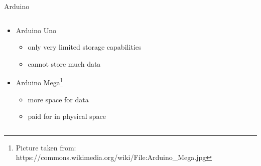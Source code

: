 \documentclass{beamer}
\begin{document}
	\begin{frame}[t]{Arduino}
		\begin{columns}[T]
			\begin{column}{0.5\textwidth}
				\begin{minipage}{\textwidth}
					\resizebox{0.9\textwidth}{!}{}
				\end{minipage}
				\begin{minipage}{\textwidth}
					\vspace{0.5cm}
					\begin{itemize}
						\item Arduino Uno
							\begin{itemize}
								\item only very limited storage capabilities
								\item cannot store much data
							\end{itemize}
						\item Arduino Mega\footnote{Picture taken from: https://commons.wikimedia.org/wiki/File:Arduino\_Mega.jpg}
							\begin{itemize}
								\item more space for data
								\item paid for in physical space
							\end{itemize}
					\end{itemize}
				\end{minipage}
			\end{column}
			\begin{column}{0.5\textwidth}

\end{column}
\end{columns}
\end{frame}
\end{document}
